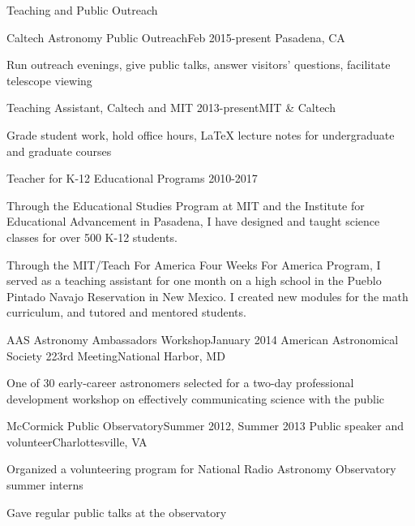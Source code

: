 \documentclass{resume} %
\begin{document}

\begin{rSection}{Teaching and Public Outreach}

  \begin{rSubsection}{Caltech Astronomy Public Outreach}{Feb 2015-present}
    {}{Pasadena, CA}
  \item Run outreach evenings, give public talks, answer visitors' questions,
    facilitate telescope viewing
  \end{rSubsection}

  \begin{rSubsection}{Teaching Assistant, Caltech and MIT} 
    {2013-present}{}{MIT \& Caltech}
  \item Grade student work, hold office hours, LaTeX lecture notes
    for undergraduate and graduate courses
  \end{rSubsection}

  \begin{rSubsection}{Teacher for K-12 Educational Programs}
    {2010-2017}{}{}
  \item Through the Educational Studies Program at MIT and the 
    Institute for Educational Advancement in Pasadena, 
    I have designed and taught science
    classes for over 500 K-12 students.
  \item Through the MIT/Teach For America Four Weeks For America Program,
    I served as a teaching assistant for one month on a high school in
    the Pueblo Pintado Navajo Reservation in New Mexico. I created
    new modules for the math curriculum, and tutored and mentored students.
  \end{rSubsection}

  \begin{rSubsection}{AAS Astronomy Ambassadors Workshop}{January 2014}
  {American Astronomical Society 223rd Meeting}{National Harbor, MD}
  \item One of 30 early-career astronomers selected for a two-day professional development workshop on effectively communicating science with the public
  \end{rSubsection}

  \begin{rSubsection}{McCormick Public Observatory}{Summer 2012, Summer 2013}
    {Public speaker and volunteer}{Charlottesville, VA}
  \item Organized a volunteering program for National Radio Astronomy Observatory summer interns
  \item Gave regular public talks at the observatory
  \end{rSubsection}

\end{rSection}
\end{document}
